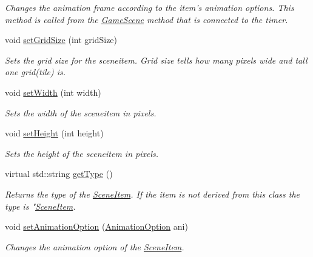 \begin{DoxyCompactItemize}
\begin{DoxyCompactList}\small\item\em Changes the animation frame according to the item's animation options. This method is called from the \hyperlink{class_student_1_1_game_scene}{Game\-Scene} method that is connected to the timer. \end{DoxyCompactList}\item 
void \hyperlink{class_student_1_1_scene_item_a946a1fe6fee7bf73d1dfdf2e0711f367}{set\-Grid\-Size} (int grid\-Size)
\begin{DoxyCompactList}\small\item\em Sets the grid size for the sceneitem. Grid size tells how many pixels wide and tall one grid(tile) is. \end{DoxyCompactList}\item 
void \hyperlink{class_student_1_1_scene_item_a2e32949bb419f6758eabb57d1035bfb9}{set\-Width} (int width)
\begin{DoxyCompactList}\small\item\em Sets the width of the sceneitem in pixels. \end{DoxyCompactList}\item 
void \hyperlink{class_student_1_1_scene_item_a5ceb9e671693ae10aa100437b72fa4fb}{set\-Height} (int height)
\begin{DoxyCompactList}\small\item\em Sets the height of the sceneitem in pixels. \end{DoxyCompactList}\item 
virtual std\-::string \hyperlink{class_student_1_1_scene_item_abeddbd7b240ebfa74579be94de8278a8}{get\-Type} ()
\begin{DoxyCompactList}\small\item\em Returns the type of the \hyperlink{class_student_1_1_scene_item}{Scene\-Item}. If the item is not derived from this class the type is "\hyperlink{class_student_1_1_scene_item}{Scene\-Item}. \end{DoxyCompactList}\item 
void \hyperlink{class_student_1_1_scene_item_afcc91d2bb5d9ec13ebc85c2f47413d43}{set\-Animation\-Option} (\hyperlink{class_student_1_1_animation_option}{Animation\-Option} ani)
\begin{DoxyCompactList}\small\item\em Changes the animation option of the \hyperlink{class_student_1_1_scene_item}{Scene\-Item}. \end{DoxyCompactList}\end{DoxyCompactItemize}
